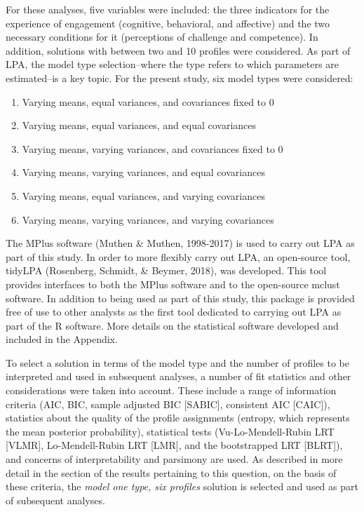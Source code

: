 \documentclass[]{book}
\providecommand{\tightlist}{%
  \setlength{\itemsep}{0pt}\setlength{\parskip}{0pt}}
\theoremstyle{definition}
\theoremstyle{definition}
\theoremstyle{definition}
\theoremstyle{remark}
\begin{document}
For these analyses, five variables were included: the three indicators
for the experience of engagement (cognitive, behavioral, and affective)
and the two necessary conditions for it (perceptions of challenge and
competence). In addition, solutions with between two and 10 profiles
were considered. As part of LPA, the model type selection--where the
type refers to which parameters are estimated--is a key topic. For the
present study, six model types were considered:

\begin{enumerate}
\def\labelenumi{\arabic{enumi}.}
\tightlist
\item
  Varying means, equal variances, and covariances fixed to 0
\item
  Varying means, equal variances, and equal covariances
\item
  Varying means, varying variances, and covariances fixed to 0
\item
  Varying means, varying variances, and equal covariances
\item
  Varying means, equal variances, and varying covariances
\item
  Varying means, varying variances, and varying covariances
\end{enumerate}

The MPlus software (Muthen \& Muthen, 1998-2017) is used to carry out
LPA as part of this study. In order to more flexibly carry out LPA, an
open-source tool, tidyLPA (Rosenberg, Schmidt, \& Beymer, 2018), was
developed. This tool provides interfaces to both the MPlus software and
to the open-source mclust software. In addition to being used as part of
this study, this package is provided free of use to other analysts as
the first tool dedicated to carrying out LPA as part of the R software.
More details on the statistical software developed and included in the
Appendix.

To select a solution in terms of the model type and the number of
profiles to be interpreted and used in subsequent analyses, a number of
fit statistics and other considerations were taken into account. These
include a range of information criteria (AIC, BIC, sample adjusted BIC
{[}SABIC{]}, consistent AIC {[}CAIC{]}), statistics about the quality of
the profile assignments (entropy, which represents the mean posterior
probability), statistical tests (Vu-Lo-Mendell-Rubin LRT {[}VLMR{]},
Lo-Mendell-Rubin LRT {[}LMR{]}, and the bootstrapped LRT {[}BLRT{]}),
and concerns of interpretability and parsimony are used. As described in
more detail in the section of the results pertaining to this question,
on the basis of these criteria, the \emph{model one type, six profiles}
solution is selected and used as part of subsequent analyses.
\end{document}
